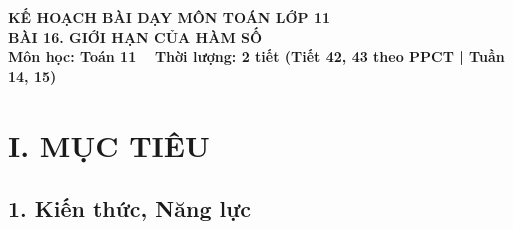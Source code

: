 \documentclass[12pt, a4paper]{article}
\begin{document}
\begin{center}
    {\fontsize{14pt}{17pt}\selectfont \textbf{KẾ HOẠCH BÀI DẠY MÔN TOÁN LỚP 11}}\\[6pt]
    {\fontsize{16pt}{19pt}\selectfont \textbf{BÀI 16. GIỚI HẠN CỦA HÀM SỐ}}\\[4pt]
    {\fontsize{12pt}{15pt}\selectfont \textbf{Môn học: Toán 11} \ \textbar \ \textbf{Thời lượng: 2 tiết (Tiết 42, 43 theo PPCT | Tuần 14, 15)}}
\end{center}

\vspace{5pt}

\section*{I. MỤC TIÊU}

\subsection*{1. Kiến thức, Năng lực}
\end{document}
